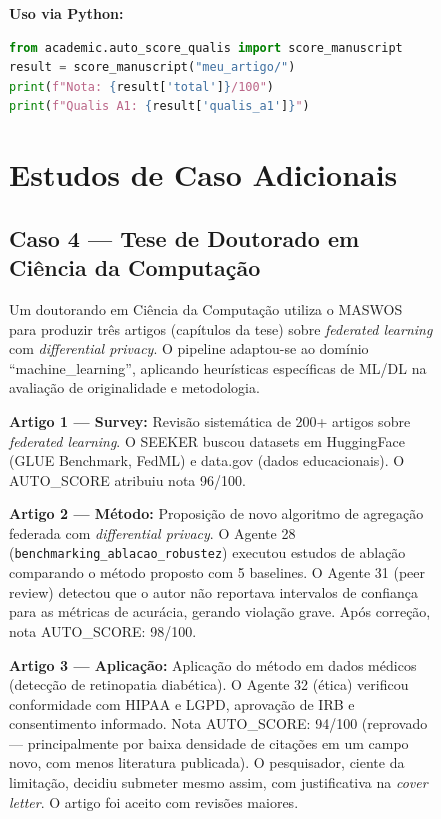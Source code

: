 \begin{figure}
\textbf{Uso via Python:}
\begin{lstlisting}[language=Python, basicstyle=\ttfamily\footnotesize]
from academic.auto_score_qualis import score_manuscript
result = score_manuscript("meu_artigo/")
print(f"Nota: {result['total']}/100")
print(f"Qualis A1: {result['qualis_a1']}")
\end{lstlisting}




\section{Estudos de Caso Adicionais}
\label{sec:casos_adicionais}

\subsection{Caso 4 — Tese de Doutorado em Ciência da Computação}
\label{sec:caso4}

Um doutorando em Ciência da Computação utiliza o MASWOS para
produzir três artigos (capítulos da tese) sobre \textit{federated
learning} com \textit{differential privacy}. O pipeline adaptou-se
ao domínio ``machine\_learning'', aplicando heurísticas específicas
de ML/DL na avaliação de originalidade e metodologia.

\textbf{Artigo 1 — Survey:} Revisão sistemática de 200+ artigos
sobre \textit{federated learning}. O SEEKER buscou datasets em
HuggingFace (GLUE Benchmark, FedML) e data.gov (dados
educacionais). O AUTO\_SCORE atribuiu nota 96/100.

\textbf{Artigo 2 — Método:} Proposição de novo algoritmo de
agregação federada com \textit{differential privacy}. O Agente 28
(\texttt{benchmarking\_ablacao\_robustez}) executou estudos de
ablação comparando o método proposto com 5 baselines. O Agente 31
(peer review) detectou que o autor não reportava intervalos de
confiança para as métricas de acurácia, gerando violação grave.
Após correção, nota AUTO\_SCORE: 98/100.

\textbf{Artigo 3 — Aplicação:} Aplicação do método em dados
médicos (detecção de retinopatia diabética). O Agente 32 (ética)
verificou conformidade com HIPAA e LGPD, aprovação de IRB e
consentimento informado. Nota AUTO\_SCORE: 94/100 (reprovado —
principalmente por baixa densidade de citações em um campo novo,
com menos literatura publicada). O pesquisador, ciente da
limitação, decidiu submeter mesmo assim, com justificativa na
\textit{cover letter}. O artigo foi aceito com revisões maiores.


\end{figure}
